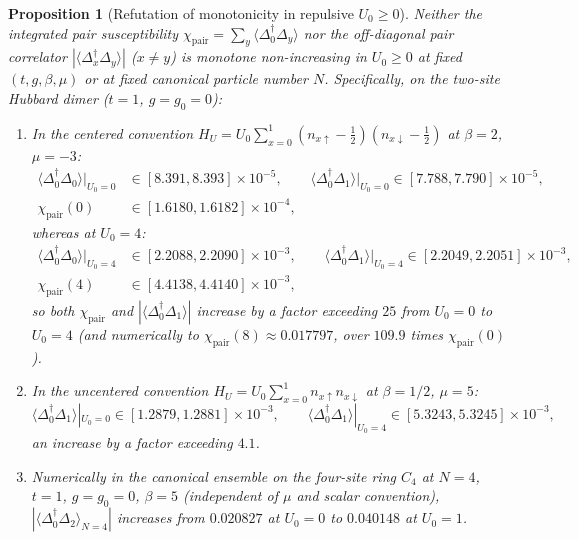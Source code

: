\documentclass[11pt]{article}
\newtheorem{proposition}[theorem]{Proposition}
\theoremstyle{definition}
\theoremstyle{remark}
\newcommand{\pair}{\mathrm{pair}}
\begin{document}
\begin{proposition}[Refutation of monotonicity in repulsive $U_0\ge0$]
\label{prop:nonmonotone}
Neither the integrated pair susceptibility $\chi_{\pair}=\sum_{y}\langle\Delta_0^\dagger
\Delta_y\rangle$ nor the off-diagonal pair correlator $|\langle\Delta_x^\dagger\Delta_y
\rangle|$ ($x\ne y$) is monotone non-increasing in $U_0\ge0$ at fixed
$(t,g,\beta,\mu)$ or at fixed canonical particle number $N$. Specifically, on the
two-site Hubbard dimer ($t=1$, $g=g_0=0$):
\begin{enumerate}[label=(\roman*),leftmargin=2.2em]
\item In the centered convention $H_U=U_0\sum_{x=0}^1(n_{x\uparrow}-\tfrac12)
(n_{x\downarrow}-\tfrac12)$ at $\beta=2$, $\mu=-3$:
\[
\begin{aligned}
\langle\Delta_0^\dagger\Delta_0\rangle|_{U_0=0}&\in[8.391,8.393]\times10^{-5},\qquad
\langle\Delta_0^\dagger\Delta_1\rangle|_{U_0=0}\in[7.788,7.790]\times10^{-5},\\
\chi_{\pair}(0)&\in[1.6180,1.6182]\times10^{-4},
\end{aligned}
\]
whereas at $U_0=4$:
\[
\begin{aligned}
\langle\Delta_0^\dagger\Delta_0\rangle|_{U_0=4}&\in[2.2088,2.2090]\times10^{-3},\qquad
\langle\Delta_0^\dagger\Delta_1\rangle|_{U_0=4}\in[2.2049,2.2051]\times10^{-3},\\
\chi_{\pair}(4)&\in[4.4138,4.4140]\times10^{-3},
\end{aligned}
\]
so both $\chi_{\pair}$ and $|\langle\Delta_0^\dagger\Delta_1\rangle|$ increase by a
factor exceeding $25$ from $U_0=0$ to $U_0=4$ (and numerically to
$\chi_{\pair}(8)\approx0.017797$, over $109.9$ times $\chi_{\pair}(0)$).
\item In the uncentered convention $H_U=U_0\sum_{x=0}^1 n_{x\uparrow}n_{x\downarrow}$
at $\beta=1/2$, $\mu=5$:
\[
\langle\Delta_0^\dagger\Delta_1\rangle|_{U_0=0}\in[1.2879,1.2881]\times10^{-3},
\qquad
\langle\Delta_0^\dagger\Delta_1\rangle|_{U_0=4}\in[5.3243,5.3245]\times10^{-3},
\]
an increase by a factor exceeding $4.1$.
\item Numerically in the canonical ensemble on the four-site ring $C_4$ at $N=4$,
$t=1$, $g=g_0=0$, $\beta=5$ (independent of $\mu$ and scalar convention),
$|\langle\Delta_0^\dagger\Delta_2\rangle_{N=4}|$ increases from $0.020827$ at
$U_0=0$ to $0.040148$ at $U_0=1$.
\end{enumerate}
\end{proposition}
\end{document}
